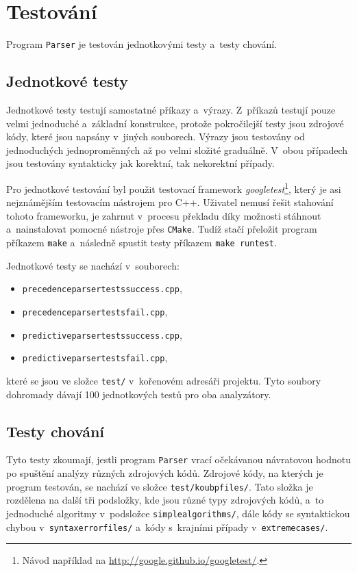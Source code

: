 \section{Testování}
Program \texttt{Parser} je testován jednotkovými testy a~testy chování.

\subsection*{Jednotkové testy}

Jednotkové testy testují samostatné příkazy a~výrazy.
Z~příkazů testují pouze velmi jednoduché a~základní konstrukce, protože pokročilejší testy jsou zdrojové kódy, které jsou napsány v~jiných souborech.
Výrazy jsou testovány od jednoduchých jednoproměnných až po velmi složité graduálně.
V~obou případech jsou testovány syntakticky jak korektní, tak nekorektní případy.

Pro jednotkové testování byl použit testovací framework \emph{googletest}\footnote{Návod například na \href{http://google.github.io/googletest/}{http://google.github.io/googletest/}.}, který je asi nejznámějším testovacím nástrojem pro C++.
Uživatel nemusí řešit stahování tohoto frameworku, je zahrnut v~procesu překladu díky možnosti stáhnout a~nainstalovat pomocné nástroje přes \texttt{CMake}.
Tudíž stačí přeložit program příkazem \texttt{make} a~následně spustit testy příkazem \texttt{make runtest}.

Jednotkové testy se nachází v~souborech:
\begin{itemize}
    \item \texttt{precedence\textunderscore parser\textunderscore tests\textunderscore success.cpp},
    \item \texttt{precedence\textunderscore parser\textunderscore tests\textunderscore fail.cpp},
    \item \texttt{predictive\textunderscore parser\textunderscore tests\textunderscore success.cpp},
    \item \texttt{predictive\textunderscore parser\textunderscore tests\textunderscore fail.cpp},
\end{itemize}
které se jsou ve složce \texttt{test/} v~kořenovém adresáři projektu.
Tyto soubory dohromady dávají 100 jednotkových testů pro oba analyzátory.

\subsection*{Testy chování}
Tyto testy zkoumají, jestli program \texttt{Parser} vrací očekávanou návratovou hodnotu po spuštění analýzy různých zdrojových kódů.
Zdrojové kódy, na kterých je program testován, se nachází ve složce \texttt{test/koubp\textunderscore files/}.
Tato složka je rozdělena na další tři podsložky, kde jsou různé typy zdrojových kódů, a~to jednoduché algoritmy v~podsložce \texttt{simple\textunderscore algorithms/}, dále kódy se syntaktickou chybou v~\texttt{syntax\textunderscore error\textunderscore files/} a~kódy s~krajními případy v~\texttt{extreme\textunderscore cases/}.

